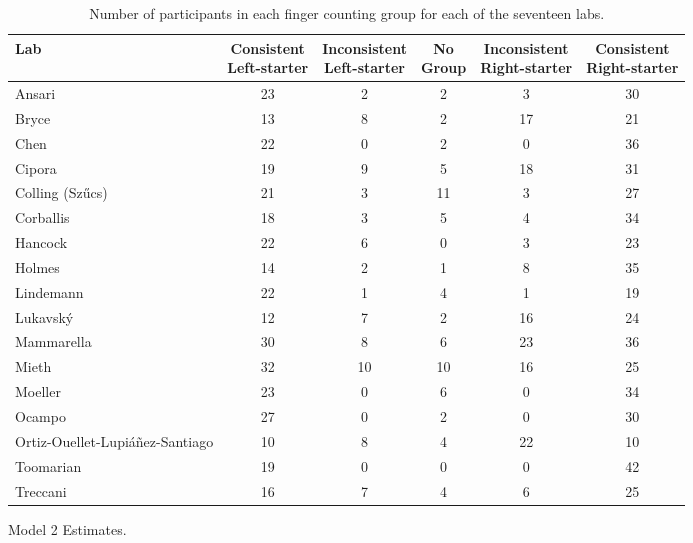 \documentclass[man,floatsintext]{apa6}
\theoremstyle{definition}
\theoremstyle{definition}
\theoremstyle{definition}
\theoremstyle{remark}
\begin{document}
\begin{appendix}
\begin{table}
\caption{\label{tab:count}Number of participants in each finger counting group for each of the seventeen labs.}
\centering
\begin{tabular}[t]{lccccc}
\toprule
Lab & \makecell[c]{Consistent\\Left-starter} & \makecell[c]{Inconsistent\\Left-starter} & \makecell[c]{No\\Group} & \makecell[c]{Inconsistent\\Right-starter} & \makecell[c]{Consistent\\Right-starter}\\
\midrule
Ansari & 23 & 2 & 2 & 3 & 30\\
Bryce & 13 & 8 & 2 & 17 & 21\\
Chen & 22 & 0 & 2 & 0 & 36\\
Cipora & 19 & 9 & 5 & 18 & 31\\
Colling (Szűcs) & 21 & 3 & 11 & 3 & 27\\
Corballis & 18 & 3 & 5 & 4 & 34\\
Hancock & 22 & 6 & 0 & 3 & 23\\
Holmes & 14 & 2 & 1 & 8 & 35\\
Lindemann & 22 & 1 & 4 & 1 & 19\\
Lukavský & 12 & 7 & 2 & 16 & 24\\
Mammarella & 30 & 8 & 6 & 23 & 36\\
Mieth & 32 & 10 & 10 & 16 & 25\\
Moeller & 23 & 0 & 6 & 0 & 34\\
Ocampo & 27 & 0 & 2 & 0 & 30\\
Ortiz-Ouellet-Lupiáñez-Santiago & 10 & 8 & 4 & 22 & 10\\
Toomarian & 19 & 0 & 0 & 0 & 42\\
Treccani & 16 & 7 & 4 & 6 & 25\\
\bottomrule
\end{tabular}
\end{table}

\begin{table}[!p]
\caption{\label{tab:mod2}Model 2 Estimates.}
\begin{subtable}{\textwidth}
\centering
\begin{table}[H]\centering\begingroup\fontsize{10}{12}\selectfont


\end{table}
\end{subtable}
\end{table}
\end{appendix}
\end{document}
